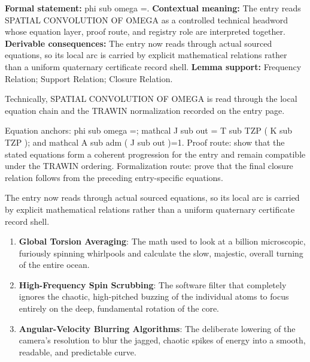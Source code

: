 \begingroup\footnotesize\setlength{\emergencystretch}{3em}\sloppy
\textbf{Formal statement:} phi sub omega =. \textbf{Contextual meaning:} The entry reads SPATIAL CONVOLUTION OF OMEGA as a controlled technical headword whose equation layer, proof route, and registry role are interpreted together. \textbf{Derivable consequences:} The entry now reads through actual sourced equations, so its local arc is carried by explicit mathematical relations rather than a uniform quaternary certificate record shell. \textbf{Lemma support:} Frequency Relation; Support Relation; Closure Relation.\par
\endgroup

Technically, SPATIAL CONVOLUTION OF OMEGA is read through the local equation chain and the TRAWIN normalization recorded on the entry page.

Equation anchors: phi sub omega =; mathcal J sub out = T sub TZP ( K sub TZP ); and mathcal A sub adm ( J sub out )=1. Proof route: show that the stated equations form a coherent progression for the entry and remain compatible under the TRAWIN ordering. Formalization route: prove that the final closure relation follows from the preceding entry-specific equations.

The entry now reads through actual sourced equations, so its local arc is carried by explicit mathematical relations rather than a uniform quaternary certificate record shell.
\endgroup

\begin{enumerate}[leftmargin=1.6em,itemsep=6pt,topsep=4pt]
\item \textbf{Global Torsion Averaging}: The math used to look at a billion microscopic, furiously spinning whirlpools and calculate the slow, majestic, overall turning of the entire ocean.
\item \textbf{High-Frequency Spin Scrubbing}: The software filter that completely ignores the chaotic, high-pitched buzzing of the individual atoms to focus entirely on the deep, fundamental rotation of the core.
\item \textbf{Angular-Velocity Blurring Algorithms}: The deliberate lowering of the camera's resolution to blur the jagged, chaotic spikes of energy into a smooth, readable, and predictable curve.
\end{enumerate}


